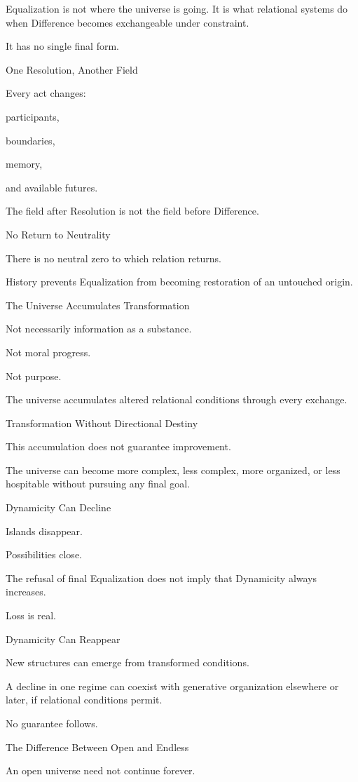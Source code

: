 Equalization is not where the universe is going. It is what relational systems do when Difference becomes exchangeable under constraint.

It has no single final form.

One Resolution, Another Field

Every act changes:

participants,

boundaries,

memory,

and available futures.

The field after Resolution is not the field before Difference.

No Return to Neutrality

There is no neutral zero to which relation returns.

History prevents Equalization from becoming restoration of an untouched origin.

The Universe Accumulates Transformation

Not necessarily information as a substance.

Not moral progress.

Not purpose.

The universe accumulates altered relational conditions through every exchange.

Transformation Without Directional Destiny

This accumulation does not guarantee improvement.

The universe can become more complex, less complex, more organized, or less hospitable without pursuing any final goal.

Dynamicity Can Decline

Islands disappear.

Possibilities close.

The refusal of final Equalization does not imply that Dynamicity always increases.

Loss is real.

Dynamicity Can Reappear

New structures can emerge from transformed conditions.

A decline in one regime can coexist with generative organization elsewhere or later, if relational conditions permit.

No guarantee follows.

The Difference Between Open and Endless

An open universe need not continue forever.

